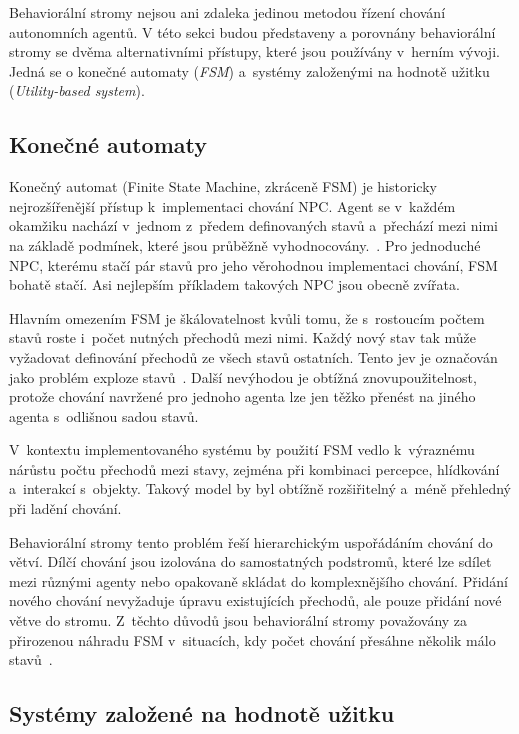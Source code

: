 Behaviorální stromy nejsou ani zdaleka jedinou metodou řízení chování autonomních agentů.
V této sekci budou představeny a porovnány behaviorální stromy se dvěma alternativními přístupy, které jsou používány v~herním vývoji.
Jedná se o konečné automaty (\textit{FSM}) a~systémy založenými na hodnotě užitku (\textit{Utility-based system}).


\subsection{Konečné automaty}

Konečný automat (Finite State Machine, zkráceně FSM) je historicky nejrozšířenější přístup k~implementaci chování NPC. 
Agent se v~každém okamžiku nachází v~jednom z~předem definovaných stavů a~přechází mezi nimi na základě podmínek, které jsou průběžně vyhodnocovány.~\cite[s.~318]{millington2006}. 
Pro jednoduché NPC, kterému stačí pár stavů pro jeho věrohodnou implementaci chování, FSM bohatě stačí.
Asi nejlepším příkladem takových NPC jsou obecně zvířata.

Hlavním omezením FSM je škálovatelnost kvůli tomu, že s~rostoucím počtem stavů roste i~počet nutných přechodů mezi nimi. 
Každý nový stav tak může vyžadovat definování přechodů ze všech stavů ostatních. 
Tento jev je označován jako problém exploze stavů~\cite[s.~5]{colledanchise2018}. 
Další nevýhodou je obtížná znovupoužitelnost, protože chování navržené pro jednoho agenta 
lze jen těžko přenést na jiného agenta s~odlišnou sadou stavů.

V~kontextu implementovaného systému by použití FSM vedlo k~výraznému nárůstu počtu přechodů mezi stavy, zejména při kombinaci percepce, hlídkování 
a~interakcí s~objekty. 
Takový model by byl obtížně rozšiřitelný a~méně přehledný při ladění chování.

Behaviorální stromy tento problém řeší hierarchickým uspořádáním chování do větví. 
Dílčí chování jsou izolována do samostatných podstromů, které lze sdílet mezi různými agenty nebo opakovaně skládat do komplexnějšího chování. 
Přidání nového chování nevyžaduje úpravu existujících přechodů, ale pouze přidání nové větve do stromu. 
Z~těchto důvodů jsou behaviorální stromy považovány za přirozenou náhradu FSM v~situacích, kdy počet chování přesáhne několik málo stavů~\cite[s.~5]{colledanchise2018}.

\subsection{Systémy založené na hodnotě užitku}

